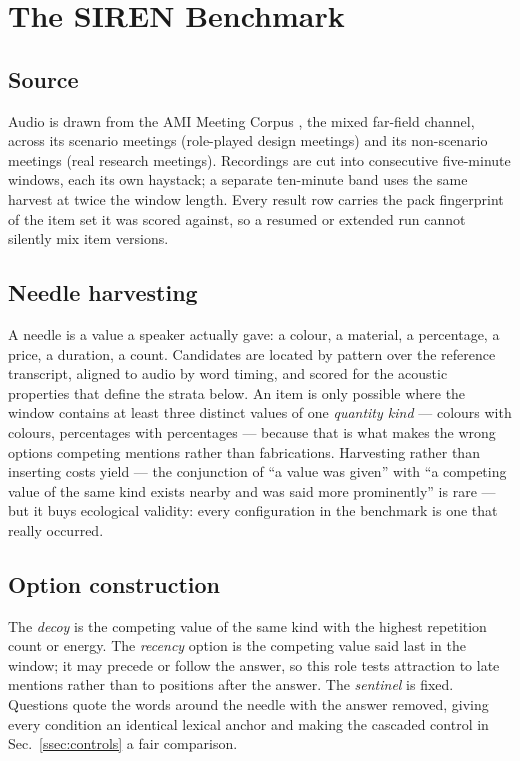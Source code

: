\documentclass{article}
\newcommand{\bench}{SIREN}
\newcommand{\corpus}{the AMI Meeting Corpus}
\begin{document}
\section{The \bench{} Benchmark}
\label{sec:bench}

\subsection{Source}
Audio is drawn from \corpus{} \cite{ami}, the mixed far-field channel, across
its scenario meetings (role-played design meetings) and its non-scenario
meetings (real research meetings). Recordings are cut into consecutive
five-minute windows, each its own haystack; a separate ten-minute band uses
the same harvest at twice the window length. Every result row carries the
pack fingerprint of the item set it was scored against, so a resumed or
extended run cannot silently mix item versions.

\subsection{Needle harvesting}
A needle is a value a speaker actually gave: a colour, a material, a
percentage, a price, a duration, a count. Candidates are located by pattern
over the reference transcript, aligned to audio by word timing, and scored
for the acoustic properties that define the strata below. An item is only
possible where the window contains at least three distinct values of one
\emph{quantity kind} --- colours with colours, percentages with percentages
--- because that is what makes the wrong options competing mentions rather
than fabrications. Harvesting rather than inserting costs yield --- the
conjunction of ``a value was given'' with ``a competing value of the same
kind exists nearby and was said more prominently'' is rare --- but it buys
ecological validity: every configuration in the benchmark is one that
really occurred.

\subsection{Option construction}
The \emph{decoy} is the competing value of the same kind with the highest
repetition count or energy. The \emph{recency} option is the competing value
said last in the window; it may precede or follow the answer, so this role
tests attraction to late mentions rather than to positions after the answer.
The \emph{sentinel} is fixed. Questions quote the words around the needle
with the answer removed, giving every condition an identical lexical anchor
and making the cascaded control in Sec.~\ref{ssec:controls} a fair
comparison.
\end{document}
